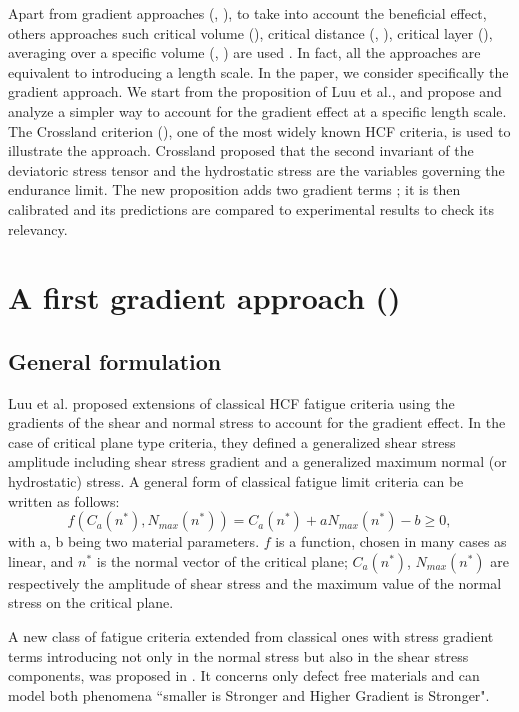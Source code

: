 Apart from gradient approaches (\cite{Amargier20101904}, \cite{Papadopoulos1996513}), to take into account the beneficial effect, others approaches such critical volume (\cite{maitournam2009fatigue}), critical distance (\cite{taylor2010theory}, \cite{Araujo200795}), critical layer (\cite{flavenot1983epaisseur}), averaging over a specific volume (\cite{palin2000stress}, \cite{Banvillet2003755}) are used . In fact, all the approaches are equivalent to introducing a length scale. 
In the paper, we consider specifically the gradient approach. We start from the proposition of Luu et al., and propose and analyze a simpler way to account for the gradient effect at a specific length scale. The Crossland criterion (\cite{crossland1956effect}), one of the most widely known HCF criteria, is used to illustrate the approach. Crossland proposed that the second invariant of the deviatoric stress tensor and the hydrostatic stress are the variables governing the endurance limit. 
The new proposition adds two gradient terms ; it is then calibrated and its predictions are compared to experimental results to check its relevancy.


\section{A first gradient approach (\cite{luu2014formulation})}
\subsection{General formulation}

Luu et al. \cite{luu2014formulation} proposed extensions of classical HCF fatigue criteria using the gradients of the shear and normal stress to account for the gradient effect. In the case of critical plane type criteria, they defined a generalized shear stress amplitude including shear stress gradient and a generalized maximum normal (or hydrostatic) stress.
A general form of classical fatigue limit criteria can be written as follows:
\begin{equation}
	\label{eq:classical}
	f(C_a(n^*),N_{max}(n^*))=C_a(n^*)+aN_{max}(n^*)-b\geqslant 0 ,
\end{equation}
with a, b being two material parameters. $f$ is a function, chosen in many cases as linear, and $n^*$ is the normal vector of the critical plane; $C_a(n^* )$, $N_{max} (n^* )$ are respectively the amplitude of shear stress and the maximum value of the normal stress on the critical plane.

A new class of fatigue criteria extended from classical ones with stress gradient terms introducing not only in the normal stress but also in the shear stress components, was proposed in \cite{luu2014formulation}. It concerns only defect free materials and can model both phenomena ``smaller is Stronger and Higher Gradient is Stronger". 

